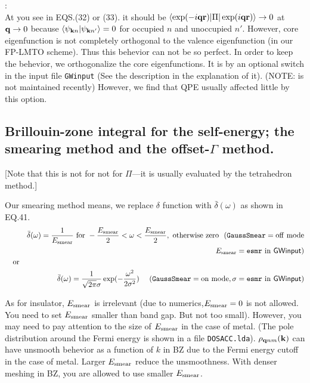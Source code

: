 \documentclass[a4paper,10pt,epsf,fleqn]{article}
\newcommand{\keyw}[1]{\fbox{\tt #1}}
\newcommand{\bfq}{{\bf q}}
\newcommand{\bfk}{{\bf k}}
\newcommand{\bfr}{{\bf r}}
\newcommand{\io}[1]{{\sf  #1}}
\newcommand{\raw}[1]{{\tt #1}}
\begin{document}
:\\
At you see in EQS.(32) or (33).
it should be $\langle \exp(-i \bfq \bfr) | \Pi | \exp(i \bfq \bfr) \rangle \to 0$ 
at $\bfq \to 0$ because $\langle \psi_{\bfk n} | \psi_{\bfk n'}\rangle=0$
for occupied $n$ and unoccupied $n'$.
However, core eigenfunction is not completely orthogonal
to the valence eigenfunction (in our FP-LMTO scheme). 
Thus this behevior can not be so perfect.
In order to keep the behevior, we orthogonalize
the core eigenfunctions. It is by an optional switch
\keyw{CoreOrth} in the input file {\tt GWinput}
(See the description in the explanation of it). 
(NOTE:\keyw{CoreOrth}  is not maintained recently)
However, we find that QPE  usually affected little by this option.

\subsection{Brillouin-zone integral for the self-energy; 
the smearing method and the offset-$\Gamma$ method.}
\label{kint}

[Note that this is not for not for $\Pi$---it is usually evaluated by the tetrahedron method.]

Our smearing method means, we replace $\delta$ function with $\bar{\delta}(\omega)$ as shown in EQ.41. 
\setlength{\mathindent}{-5mm}
\begin{eqnarray}
&&\bar{\delta}(\omega) = \frac{1}{E_{\rm smear}} 
{\rm \ for \ } -\frac{E_{\rm smear}}{2}<\omega <\frac{E_{\rm smear}}{2}, {\rm \  otherwise \ zero \ \ ({\tt GaussSmear}=off \ mode} \nonumber \\
&& \hspace{7cm} \ E_{\rm smear} = \raw{esmr} \ {\rm in} \ \io{GWinput})\\
\nonumber {\rm \ \ \ or} \\
&&\bar{\delta}(\omega) = \frac{1}{\sqrt{2 \pi} \sigma} \exp( -\frac{\omega^2}{2 \sigma^2}) \ \ \ {\rm \  ({\tt GaussSmear}=on \ mode, \sigma = \raw{esmr} \ in \ \io{GWinput})} \nonumber
\end{eqnarray}
\setlength{\mathindent}{0mm}

As for insulator, $E_{\rm smear}$ is irrelevant
(due to numerics,$E_{\rm smear}=0$ is not allowed. 
You need to set $E_{\rm smear}$ smaller than band gap. 
But not too small).
However, you may need to pay attention to the size of 
$E_{\rm smear}$ in the case of metal.
(The pole distribution around the Fermi energy 
is shown in a file {\tt DOSACC.lda}).
$\rho_{{\bf q}nm}({\bf k})$ can have unsmooth behevior 
as a function of $k$ in BZ due to the Fermi energy cutoff 
in the case of metal.
Larger $E_{\rm smear}$ reduce the unsmoothness.
With denser meshing in BZ, you are allowed to use smaller $E_{\rm smear}$.\\
\end{document}
